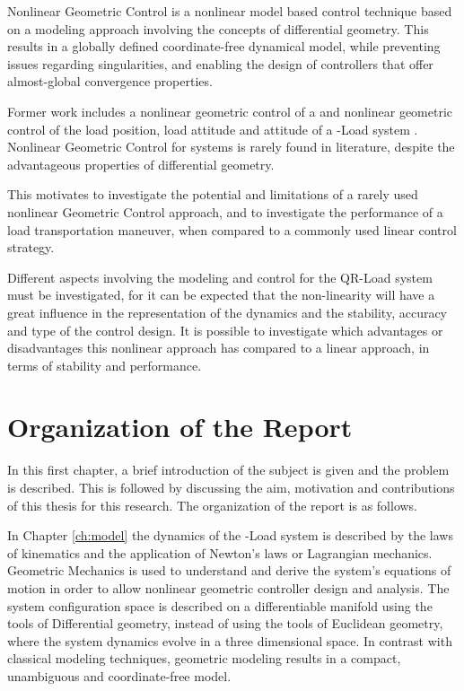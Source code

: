 Nonlinear Geometric Control is a nonlinear model based control technique based on a modeling approach involving the concepts of differential geometry. This results in a globally defined coordinate-free dynamical model, while preventing issues regarding singularities, and enabling the design of controllers that offer almost-global convergence properties.

Former work includes a nonlinear geometric control of a  \cite{Lee2010,Goodarzi2013a} and nonlinear geometric control of the load position, load attitude and  attitude of a -Load system \cite{Sreenath2013a,Sreenath2013b,Tang2014}.
Nonlinear Geometric Control for  systems is rarely found in literature, despite the advantageous properties of differential geometry. 

This motivates to investigate the potential and limitations of a rarely used nonlinear Geometric Control approach, and to investigate the performance of a load transportation maneuver, when compared to a commonly used linear control strategy.

Different aspects involving the modeling and control for the QR-Load system must be investigated, for it can be expected that the non-linearity will have a great influence in the representation of the dynamics and the stability, accuracy and type of the control design.
It is possible to investigate which advantages or disadvantages this nonlinear approach has compared to a linear approach, in terms of stability and performance.

%

\section{Organization of the Report}

In this first chapter, a brief introduction of the subject is given and the problem is described. This is followed by discussing the aim, motivation and contributions of this thesis for this research. The organization of the report is as follows.

In Chapter \ref{ch:model} the dynamics of the -Load system is described by the laws of kinematics and the application of Newton's laws or Lagrangian mechanics. 
Geometric Mechanics is used to understand and derive the system's equations of motion in order to allow nonlinear geometric controller design and analysis. 
The system configuration space is described on a differentiable manifold using the tools of Differential geometry, 
instead of using the tools of Euclidean geometry, where the system dynamics evolve in a three dimensional space.
In contrast with classical modeling techniques, geometric modeling results in a compact, unambiguous and coordinate-free model.

